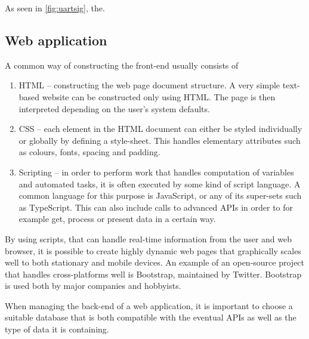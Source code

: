 As seen in \ref{fig:uartsig}, the.

\subsection{Web application}%
\label{sub:web_application}
A common way of constructing the front-end usually consists of 
\begin{enumerate}
  \item HTML -- constructing the web page document structure. A very simple text-based website can be constructed only using HTML. The page is then interpreted depending on the user's system defaults.
  \item CSS -- each element in the HTML document can either be styled individually or globally by defining a style-sheet. This handles elementary attributes such as colours, fonts, spacing and padding.  
  \item Scripting -- in order to perform work that handles computation of variables and automated tasks, it is often executed by some kind of script language. A common language for this purpose is JavaScript, or any of its super-sets such as TypeScript. This can also include calls to advanced APIs in order to for example get, process or present data in a certain way.

\end{enumerate}
By using scripts, that can handle real-time information from the user and web browser, it is possible to create highly dynamic web pages that graphically scales well to both stationary and mobile devices.
An example of an open-source project that handles cross-platforms well is Bootstrap, maintained by Twitter. Bootstrap is used both by major companies and hobbyists.

When managing the back-end of a web application, it is important to choose a suitable database that is both compatible with the eventual APIs as well as the type of data it is containing. 


